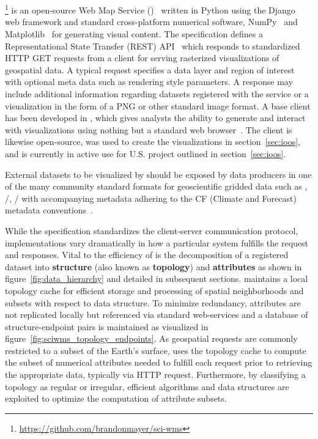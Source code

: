 \section{\sciwms{}}
\label{sec:sciwms}
\Sciwms{}\footnote{\url{https://github.com/brandonmayer/sci-wms}} is an open-source Web Map Service (\wms{})~\cite{wms14}
written in Python using the Django~\cite{django} web framework and
standard cross-platform numerical software, NumPy~\cite{numpy11} and
Matplotlib~\cite{hunter07} for generating visual content. The \wms{}
specification defines a Representational State Transfer (REST)
API~\cite{Fielding02} which responds to standardized HTTP GET requests
from a \wms{} client for serving rasterized visualizations of
geospatial data. A typical \wms{} request specifies a data layer and
region of interest with optional meta data such as rendering style
parameters. A \wms{} response may include additional information
regarding datasets registered with the service or a visualization in
the form of a PNG or other standard image format. A base \wms{} client
has been developed in \javascript{}, which gives analysts the ability
to generate and interact with visualizations using nothing but a
standard web browser~\cite{comtui}.  The \wms{} client is likewise
open-source, was used to create the visualizations in
section~\ref{sec:ioos}, and is currently in active use for
U.S. \ioos{} \comt{} project outlined in section~\ref{sec:ioos}.

External datasets to be visualized by \sciwms{} should be exposed by
data producers in one of the many community standard formats for
geoscientific gridded data such as \netcdf{}, \hdf{}/,
\grib{}/ with accompanying metadata adhering to the CF (Climate
and Forecast) metadata conventions~\cite{cf}. 

While the \ogc{} \wms{} specification standardizes the client-server
communication protocol, implementations vary dramatically in how a
particular system fulfills the \wms{} request and responses. Vital to
the efficiency of \sciwms{} is the decomposition of a registered
dataset into \textbf{structure} (also known as \textbf{topology}) and
\textbf{attributes} as shown in figure~\ref{fig:data_hierarchy} and
detailed in subsequent sections. \Sciwms{} maintains a local topology
cache for efficient storage and processing of spatial neighborhoods
and subsets with respect to data structure. To minimize redundancy,
attributes are not replicated locally but referenced via standard
web-services and a database of structure-endpoint pairs is maintained
as visualized in figure~\ref{fig:sciwms_topology_endpoints}. As
geospatial \wms{} requests are commonly restricted to a subset of the
Earth's surface, \sciwms{} uses the topology cache to compute the
subset of numerical attributes needed to fulfill each request prior to
retrieving the appropriate data, typically via HTTP request. Furthermore, by
classifying a topology as regular or irregular, efficient algorithms
and data structures are exploited to optimize the computation of
attribute subsets.

